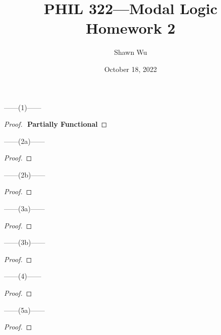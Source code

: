 \documentclass[12pt]{article}
\title{PHIL 322---Modal Logic \\Homework 2}
\author{Shawn Wu}
\date{October 18, 2022}
\begin{document}
\maketitle
\noindent
\begin{center}
    ------(1)------
\end{center}
\begin{proof} $ $
    \textbf{Partially Functional}
\end{proof}

\newpage
\noindent
\begin{center}
    ------(2a)------
\end{center}
\begin{proof}
    
\end{proof}

\noindent
\begin{center}
    ------(2b)------
\end{center}
\begin{proof}
    
\end{proof}

\newpage
\noindent
\begin{center}
    ------(3a)------
\end{center} 
\begin{proof}
    
\end{proof}

\noindent
\begin{center}
    ------(3b)------
\end{center} 
\begin{proof}
    
\end{proof}


\newpage
\noindent
\begin{center}
    ------(4)------
\end{center} 
\begin{proof}
    
\end{proof}


\newpage
\noindent
\begin{center}
    ------(5a)------
\end{center} 
\begin{proof}
    
\end{proof}
\end{document}
